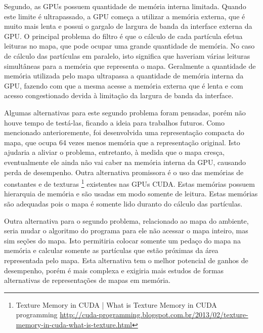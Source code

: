 \documentclass[
	12pt,				%
	openright,			%
	oneside,			%
	a4paper,			%
	english,			%
	french,				%
	spanish,			%
	brazil,				%
	]{abntex2}
\begin{document}
Segundo, as GPUs possuem quantidade de memória interna limitada. Quando este limite é ultrapassado, a GPU começa a utilizar a memória externa, que é muito mais lenta e possui o gargalo de largura de banda da interface externa da GPU. O principal problema do filtro é que o cálculo de cada partícula efetua leituras no mapa, que pode ocupar uma grande quantidade de memória. No caso de cálculo das partículas em paralelo, isto significa que haveriam várias leituras simultâneas para a memória que representa o mapa.  Geralmente a quantidade de memória utilizada pelo mapa ultrapassa a quantidade de memória interna da GPU, fazendo com que a mesma acesse a memória externa que é lenta e com acesso congestionado devida à limitação da largura de banda da interface.

Algumas alternativas para este segundo problema foram pensadas, porém não houve tempo de testá-las, ficando a ideia para trabalhos futuros. Como mencionado anterioremente, foi desenvolvida uma representação compacta do mapa, que ocupa 64 vezes menos memória que a representação original. Isto ajudaria a aliviar o problema, entretanto, à medida que o mapa cresça, eventualmente ele ainda não vai caber na memória interna da GPU, causando perda de desempenho. Outra alternativa promissora é o uso das memórias de constantes e de texturas \footnote{Texture Memory in CUDA | What is Texture Memory in CUDA programming \url{http://cuda-programming.blogspot.com.br/2013/02/texture-memory-in-cuda-what-is-texture.html}} existentes nas GPUs CUDA. Estas memórias possuem hierarquia de memória e são usadas em modo somente de leitura. Estas memórias são adequadas pois o mapa é somente lido duranto do cálculo das partículas.

Outra alternativa para o segundo problema, relacionado ao mapa do ambiente, seria mudar o algoritmo do programa para ele não acessar o mapa inteiro, mas sim seções do mapa. Isto permitiria colocar somente um pedaço do mapa na memória e calcular somente as partículas que estão próximas da área representada pelo mapa. Esta alternativa tem o melhor potencial de ganhos de desempenho, porém é mais complexa e exigiria mais estudos de formas alternativas de representações de mapas em memória.

\end{document}
